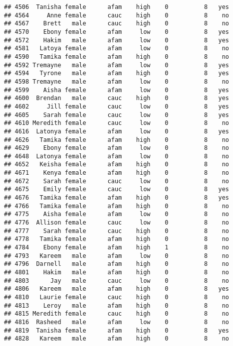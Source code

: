 \documentclass[
]{article}
\begin{document}
\begin{verbatim}
## 4506  Tanisha female      afam    high    0          8   yes
## 4564     Anne female      cauc    high    0          8    no
## 4567    Brett   male      cauc    high    0          8    no
## 4570    Ebony female      afam     low    0          8   yes
## 4572    Hakim   male      afam     low    0          8   yes
## 4581   Latoya female      afam     low    0          8    no
## 4590   Tamika female      afam    high    0          8    no
## 4592 Tremayne   male      afam     low    0          8   yes
## 4594   Tyrone   male      afam    high    0          8   yes
## 4598 Tremayne   male      afam     low    0          8    no
## 4599    Aisha female      afam     low    0          8   yes
## 4600  Brendan   male      cauc    high    0          8   yes
## 4602     Jill female      cauc     low    0          8   yes
## 4605    Sarah female      cauc     low    0          8   yes
## 4610 Meredith female      cauc     low    0          8    no
## 4616  Latonya female      afam     low    0          8   yes
## 4626   Tamika female      afam    high    0          8    no
## 4629    Ebony female      afam     low    0          8    no
## 4648  Latonya female      afam     low    0          8    no
## 4652   Keisha female      afam    high    0          8    no
## 4671    Kenya female      afam    high    0          8    no
## 4672    Sarah female      cauc     low    0          8    no
## 4675    Emily female      cauc     low    0          8   yes
## 4676   Tamika female      afam    high    0          8   yes
## 4766   Tamika female      afam    high    0          8    no
## 4775    Aisha female      afam     low    0          8    no
## 4776  Allison female      cauc     low    0          8    no
## 4777    Sarah female      cauc    high    0          8    no
## 4778   Tamika female      afam    high    0          8    no
## 4784    Ebony female      afam    high    1          8    no
## 4793   Kareem   male      afam     low    0          8    no
## 4796  Darnell   male      afam    high    0          8    no
## 4801    Hakim   male      afam    high    0          8    no
## 4803      Jay   male      cauc     low    0          8    no
## 4806   Kareem   male      afam    high    0          8   yes
## 4810   Laurie female      cauc    high    0          8    no
## 4813    Leroy   male      afam    high    0          8    no
## 4815 Meredith female      cauc    high    0          8    no
## 4816  Rasheed   male      afam     low    0          8    no
## 4819  Tanisha female      afam    high    0          8   yes
## 4828   Kareem   male      afam    high    0          8    no

\end{verbatim}
\end{document}
